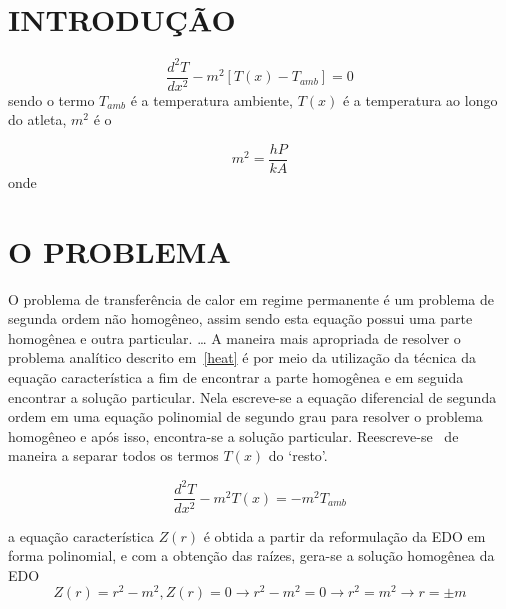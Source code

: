 \documentclass[a4paper, 12pt]{article}
\begin{document}
\vspace{0.5cm}

\section{INTRODUÇÃO}


\begin{equation}
  \label{heat}
  \frac{d^2 T}{dx^2} - m^2 [T(x) - T_{amb}] = 0
\end{equation}
sendo o termo $T_{amb}$ é a temperatura ambiente, $T(x)$ é a temperatura ao longo do atleta, $m^2$ é o 

\begin{equation}
  \label{m2}
  m^2 = \frac{hP}{kA}
\end{equation}
onde 
\section{O PROBLEMA}

O problema de transferência de calor em regime permanente é um problema de segunda ordem não homogêneo, assim sendo esta equação possui uma parte homogênea e outra particular. \ldots
A maneira mais apropriada de resolver o problema analítico descrito em~\ref{heat} é por meio da utilização da técnica da equação característica a fim de encontrar a parte homogênea e em seguida
encontrar a solução particular. Nela escreve-se a equação diferencial de segunda ordem em uma equação polinomial de segundo grau para resolver o problema homogêneo e após isso, encontra-se a solução particular. Reescreve-se~\label{heat} de maneira a separar todos os termos $T(x)$ do
`resto'.

\begin{equation}
  \label{heatmodified}
  \frac{d^2 T}{dx^2} - m^2 T(x) = - m^2 T_{amb} 
\end{equation}

a equação característica $Z(r)$ é obtida a partir da reformulação da EDO em forma polinomial, e com a obtenção das raízes, gera-se a solução homogênea da EDO 
\begin{equation}
  \label{caracter}
  Z(r) = r^2 - m^2, Z(r) = 0  \rightarrow  r^2 - m^2 = 0 \rightarrow  r^2 = m^2 \rightarrow  r = \pm m 
\end{equation}
\end{document}
